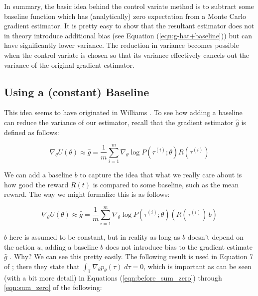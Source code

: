 \documentclass[11pt, oneside]{article}                          %
\begin{document}
\bigskip
\noindent
In summary, the basic idea behind the control variate method is
to subtract some baseline function which has (analytically) zero
expectation from a Monte Carlo gradient estimator.  It is pretty
easy to show that the resultant estimator does not in theory
introduce additional bias (see Equation
(\ref{eqn:g-hat+baseline})) but can have significantly lower
variance. The reduction in variance becomes possible when the
control variate is chosen so that its variance effectively
cancels out the variance of the original gradient estimator.

\subsection{Using a (constant) Baseline}
\label{sec:baseline}
This idea seems to have originated in Williams
\cite{Williams1992}. To see how adding a baseline can reduce the
variance of our estimator, recall that the gradient estimator
$\hat{g}$ is defined as follows:

\begin{equation}
\nabla_\theta U(\theta) \approx \hat{g} = \frac{1}{m}
\sum\limits_{i = 1}^{m} \nabla_{\theta} \log  P(\tau^{(i)} ;
\theta) R(\tau^{(i)}) 
\end{equation}

\bigskip
\noindent
We can add a baseline $b$ to capture the idea that what we really
care about is how good the reward $R(t)$ is compared to some
baseline, such as the mean reward.  The way we might formalize
this is as follows:

\begin{equation*}
\nabla_\theta U(\theta) \approx \hat{g} = \frac{1}{m} 
\sum\limits_{i = 1}^{m} \nabla_{\theta} \log  P(\tau^{(i)} ;
\theta) (R(\tau^{(i)}) \, b)
\end{equation*}

\bigskip
\noindent
$b$ here is assumed to be constant, but in reality as long as $b$
doesn't depend on the action $u$, adding a baseline $b$ does not
introduce bias to the gradient estimate $\hat{g}$
\cite{Williams1992}. Why? We can see this pretty easily. The
following result is used in Equation 7 of \cite{Peters:2006fk};
there they state that $\int_{\mathbb{T}} \nabla_{\theta}
p_{\theta}(\tau) \; d\tau = 0$, which is important as can be seen
(with a bit more detail) in Equations (\ref{eqn:before_sum_zero})
through \ref{eqn:sum_zero} of the following:
\end{document}
